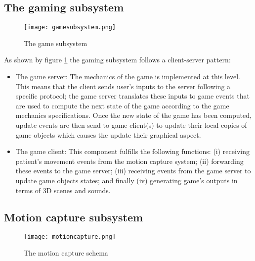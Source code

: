 \documentclass[preprint,authoryear,12pt]{elsarticle}
\begin{document}
\subsection{The gaming subsystem}

\begin{figure}[h]
	\centering
\texttt{[image: gamesubsystem.png]}
	\caption{The game subsystem}
	\label{fig:gamesubsystem}
\end{figure}
As shown by figure \ref{fig:gamesubsystem} the gaming subsystem follows a client-server pattern:
\begin{itemize}
\item The game server: The mechanics of the game is implemented at this level. This means that the client sends user's inputs to the server following a specific protocol; the game server translates these inputs to game events that are used to compute the next state of the game according to the game mechanics specifications. Once the new state of the game has been computed, update events are then send to game client(s) to update their local copies of game objects which causes the update their graphical aspect.
\item The game client: This component fulfills the following functions: (i) receiving patient's movement events from the motion capture system; (ii) forwarding these events to the game server; (iii) receiving events from the game server to update game objects states; and finally (iv) generating game's outputs in terms of 3D scenes and sounds.
\end{itemize}

\subsection{Motion capture subsystem}

\begin{figure}[h]
	\centering
		\texttt{[image: motioncapture.png]}
	\caption{The motion capture schema}
	\label{fig:motioncapture}
\end{figure}
\end{document}
